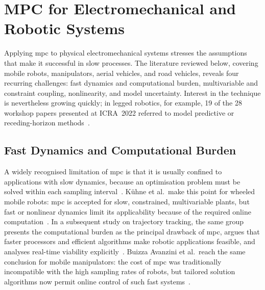 \section{MPC for Electromechanical and Robotic Systems}\label{sec:bg-apps}

Applying \ac{mpc} to physical electromechanical systems stresses the assumptions that make it successful in slow processes. The literature reviewed below, covering mobile robots, manipulators, aerial vehicles, and road vehicles, reveals four recurring challenges: fast dynamics and computational burden, multivariable and constraint coupling, nonlinearity, and model uncertainty. Interest in the technique is nevertheless growing quickly; in legged robotics, for example, 19 of the 28 workshop papers presented at ICRA~2022 referred to model predictive or receding-horizon methods~\cite{katayama2023}.

\subsection{Fast Dynamics and Computational Burden}\label{sec:bg-apps-fast}

A widely recognised limitation of \ac{mpc} is that it is usually confined to applications with slow dynamics, because an optimisation problem must be solved within each sampling interval~\cite{wang2010}. K\"uhne et al.\ make this point for wheeled mobile robots: \ac{mpc} is accepted for slow, constrained, multivariable plants, but fast or nonlinear dynamics limit its applicability because of the required online computation~\cite{kuhne2004}. In a subsequent study on trajectory tracking, the same group presents the computational burden as the principal drawback of \ac{mpc}, argues that faster processors and efficient algorithms make robotic applications feasible, and analyses real-time viability explicitly~\cite{kuhne2005}. Buizza Avanzini et al.\ reach the same conclusion for mobile manipulators: the cost of \ac{mpc} was traditionally incompatible with the high sampling rates of robots, but tailored solution algorithms now permit online control of such fast systems~\cite{buizza2018}.

